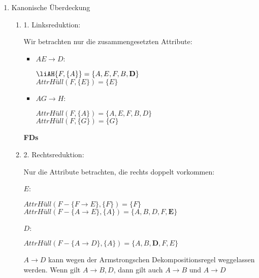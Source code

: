 \documentclass{lehramt-informatik-aufgabe}
\begin{document}
\begin{antwort}

\begin{enumerate}

\item Kanonische Überdeckung

\begin{enumerate}

%

\item 1. Linksreduktion:

Wir betrachten nur die zusammengesetzten Attribute:

\begin{itemize}
\item $AE \rightarrow D$:

$\liAH{F, \{A\}} = \{A, E, F, B, \textbf{D}\}$ \\
$\textit{AttrHüll}(F, \{E\}) = \{E\}$

\item $AG \rightarrow H$:

$\textit{AttrHüll}(F, \{A\}) = \{A, E, F, B, D\}$ \\
$\textit{AttrHüll}(F, \{G\}) = \{G\}$
\end{itemize}

\textbf{FDs}


%

\item 2. Rechtsreduktion:

Nur die Attribute betrachten, die rechts doppelt vorkommen:

$E$:

$\textit{AttrHüll}(F - \{F \rightarrow E\}, \{F\}) = \{F\}$ \\
$\textit{AttrHüll}(F - \{A \rightarrow E\}, \{A\}) = \{A, B, D, F, \textbf{E}\}$

$D$:

$\textit{AttrHüll}(F - \{A \rightarrow D\}, \{A\}) = \{A, B, \textbf{D}, F, E\}$

$A \rightarrow D$ kann wegen der Armstrongschen Dekompositionsregel
weggelassen werden. Wenn gilt $A \rightarrow B, D$, dann gilt auch $A
\rightarrow B$ und $A \rightarrow D$


\end{enumerate}
\end{enumerate}
\end{antwort}
\end{document}
